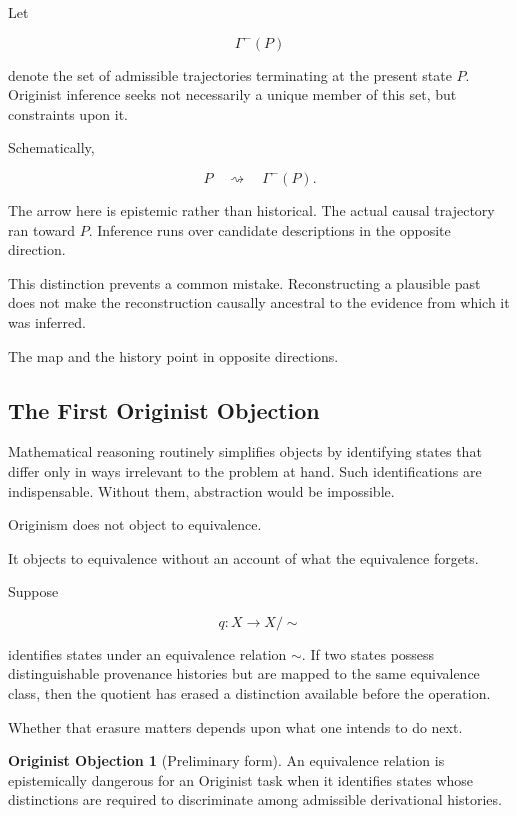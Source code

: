 \documentclass[
  11pt,
  a4paper,
  DIV=12,
  BCOR=0mm,
  parskip=half-
]{scrartcl}
\theoremstyle{definition}
\newtheorem{objection}[definition]{Originist Objection}
\theoremstyle{plain}
\theoremstyle{remark}
\begin{document}
Let

\[
  \Gamma^{-}(P)
\]

denote the set of admissible trajectories terminating at the present state
\(P\). Originist inference seeks not necessarily a unique member of this set,
but constraints upon it.

Schematically,

\[
  P
  \quad\rightsquigarrow\quad
  \Gamma^{-}(P).
\]

The arrow here is epistemic rather than historical. The actual causal
trajectory ran toward \(P\). Inference runs over candidate descriptions in
the opposite direction.

This distinction prevents a common mistake. Reconstructing a plausible past
does not make the reconstruction causally ancestral to the evidence from
which it was inferred.

The map and the history point in opposite directions.


\subsection{The First Originist Objection}
\label{sec:first-originist-objection}

Mathematical reasoning routinely simplifies objects by identifying states
that differ only in ways irrelevant to the problem at hand. Such
identifications are indispensable. Without them, abstraction would be
impossible.

Originism does not object to equivalence.

It objects to equivalence without an account of what the equivalence forgets.

Suppose

\[
  q:X\longrightarrow X/{\sim}
\]

identifies states under an equivalence relation \(\sim\). If two states
possess distinguishable provenance histories but are mapped to the same
equivalence class, then the quotient has erased a distinction available
before the operation.

Whether that erasure matters depends upon what one intends to do next.

\begin{objection}[Preliminary form]
\label{obj:preliminary-originist}
An equivalence relation is epistemically dangerous for an Originist task when
it identifies states whose distinctions are required to discriminate among
admissible derivational histories.
\end{objection}
\end{document}
